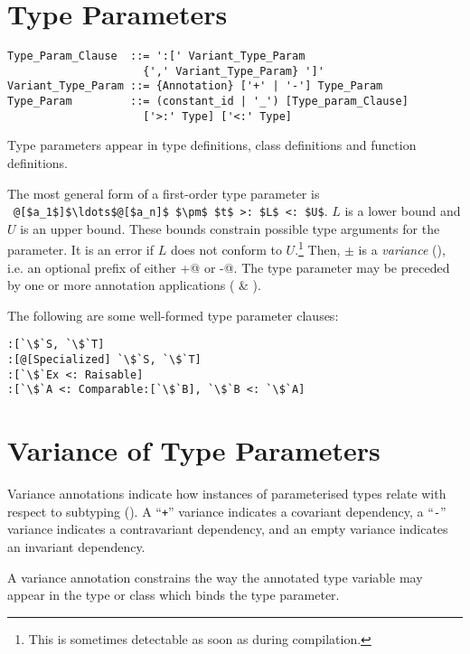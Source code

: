 \section{Type Parameters}

\syntax\begin{lstlisting}
Type_Param_Clause  ::= ':[' Variant_Type_Param 
                     {',' Variant_Type_Param} ']'
Variant_Type_Param ::= {Annotation} ['+' | '-'] Type_Param
Type_Param         ::= (constant_id | '_') [Type_param_Clause]
                     ['>:' Type] ['<:' Type]
\end{lstlisting}

Type parameters appear in type definitions, class definitions and function definitions. 

The most general form of a first-order type parameter is ~\lstinline!@[$a_1$]$\ldots$@[$a_n]$ $\pm$ $t$ >: $L$ <: $U$!. $L$ is a lower bound and $U$ is an upper bound. These bounds constrain possible type arguments for the parameter. It is an error if $L$ does not conform to $U$.\footnote{This is sometimes detectable as soon as during compilation.} Then, $\pm$ is a {\em variance} (), i.e. an optional prefix of either \lstinline@+@ or \lstinline@-@. The type parameter may be preceded by one or more annotation applications ( \& ).

\example The following are some well-formed type parameter clauses:
\begin{lstlisting}[escapechar=`]
:[`\$`S, `\$`T]
:[@[Specialized] `\$`S, `\$`T]
:[`\$`Ex <: Raisable]
:[`\$`A <: Comparable:[`\$`B], `\$`B <: `\$`A]
\end{lstlisting}


\section{Variance of Type Parameters}
\label{sec:variance-of-type-parameters}

Variance annotations indicate how instances of parameterised types relate with respect to subtyping (). A ``\lstinline!+!'' variance indicates a covariant dependency, a ``\lstinline!-!'' variance indicates a contravariant dependency, and an empty variance indicates an invariant dependency. 

A variance annotation constrains the way the annotated type variable may appear in the type or class which binds the type parameter. 


